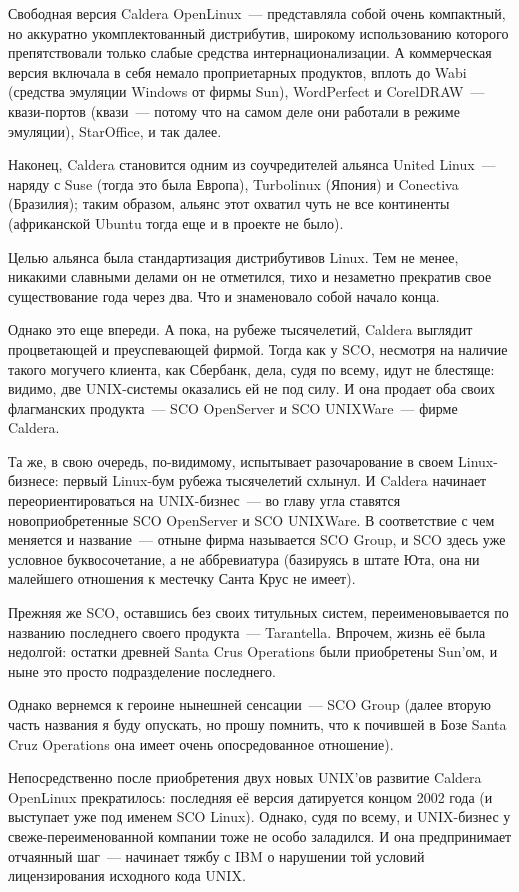 Свободная версия Caldera OpenLinux~--- представляла собой очень компактный, но аккуратно укомплектованный дистрибутив, широкому использованию которого препятствовали только слабые средства интернационализации. А коммерческая версия включала в себя немало проприетарных продуктов, вплоть до Wabi (средства эмуляции Windows от фирмы Sun), WordPerfect и CorelDRAW~--- квази-портов (квази~--- потому что на самом деле они работали в режиме эмуляции), StarOffice, и так далее.

Наконец, Caldera становится одним из соучредителей альянса United Linux~--- наряду с Suse (тогда это была Европа), Turbolinux (Япония) и Conectiva (Бразилия); таким образом, альянс этот охватил чуть не все континенты (африканской Ubuntu тогда еще и в проекте не было).

Целью альянса была стандартизация дистрибутивов Linux. Тем не менее, никакими славными делами он не отметился, тихо и незаметно прекратив свое существование года через два. Что и знаменовало собой начало конца.

Однако это еще впереди. А пока, на рубеже тысячелетий, Caldera выглядит процветающей и преуспевающей фирмой. Тогда как у SCO, несмотря на наличие такого могучего клиента, как Сбербанк, дела, судя по всему, идут не блестяще: видимо, две UNIX-системы оказались ей не под силу. И она продает оба своих флагманских продукта~--- SCO OpenServer и SCO UNIXWare~--- фирме Caldera.

Та же, в свою очередь, по-видимому, испытывает разочарование в своем Linux-бизнесе: первый Linux-бум рубежа тысячелетий схлынул. И Caldera начинает переориентироваться на UNIX-бизнес~--- во главу угла ставятся новоприобретенные SCO OpenServer и SCO UNIXWare. В соответствие с чем меняется и название~--- отныне фирма называется SCO Group, и SCO здесь уже условное буквосочетание, а не аббревиатура (базируясь в штате Юта, она ни малейшего отношения к местечку Санта Крус не имеет).

Прежняя же SCO, оставшись без своих титульных систем, переименовывается по названию последнего своего продукта~--- Tarantella. Впрочем, жизнь её была недолгой: остатки древней Santa Crus Operations были приобретены Sun'ом, и ныне это просто подразделение последнего.

Однако вернемся к героине нынешней сенсации~--- SCO Group (далее вторую часть названия я буду опускать, но прошу помнить, что к почившей в Бозе Santa Cruz Operations она имеет очень опосредованное отношение).

Непосредственно после приобретения двух новых UNIX'ов развитие Caldera OpenLinux прекратилось: последняя её версия датируется концом 2002 года (и выступает уже под именем SCO Linux). Однако, судя по всему, и UNIX-бизнес у свеже-переименованной компании тоже не особо заладился. И она предпринимает отчаянный шаг~--- начинает тяжбу с IBM о нарушении той условий лицензирования исходного кода UNIX.

